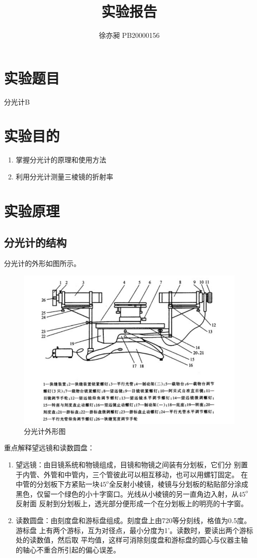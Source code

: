 \documentclass[UTF8]{ctexart}
\begin{document}
\title{实验报告}  
\author{徐亦昶 PB20000156}
\maketitle
\section{实验题目}分光计B
\section{实验目的}
\begin{enumerate}
    \item 掌握分光计的原理和使用方法
    \item 利用分光计测量三棱镜的折射率
\end{enumerate}
\section{实验原理}
\subsection{分光计的结构}
分光计的外形如图所示。
\begin{figure}[h]
    \centering
    \includegraphics[scale=1]{分光计外形图.PNG}
    \caption{分光计外形图}
\end{figure}
重点解释望远镜和读数圆盘：
\begin{enumerate}
    \item 望远镜：由目镜系统和物镜组成，目镜和物镜之间装有分划板，它们分
    别置于内管、外管和中管内，三个管彼此可以相互移动，也可以用螺钉固定。
    在中管的分划板下方紧贴一块$45^o$全反射小棱镜，棱镜与分划板的粘贴部分涂成
    黑色，仅留一个绿色的小十字窗口。光线从小棱镜的另一直角边入射，从$45^o$反射面
    反射到分划板上，透光部分便形成一个在分划板上的明亮的十字窗。
    \item 读数圆盘：由刻度盘和游标盘组成。刻度盘上由720等分刻线，格值为0.5度。游标盘
    上有两个游标，互为对径点，最小分度为1'。读数时，要读出两个游标处的读数值，然后取
    平均值，这样可消除刻度盘和游标盘的圆心与仪器主轴的轴心不重合所引起的偏心误差。
\end{enumerate}
\end{document}
